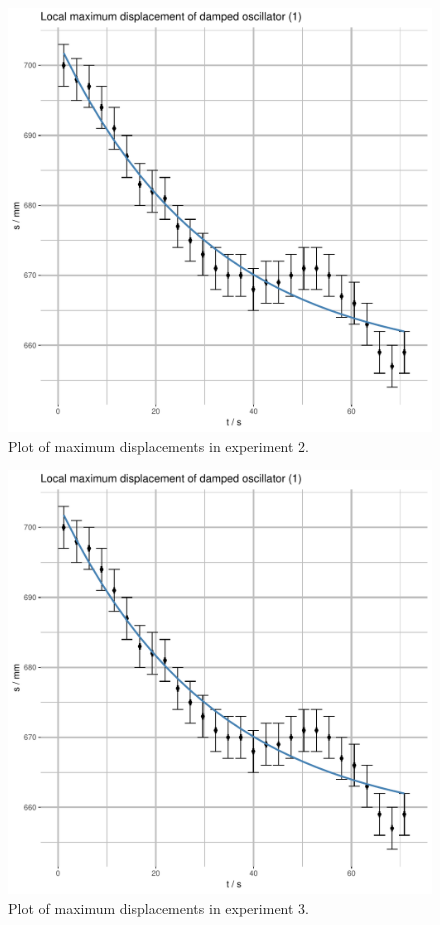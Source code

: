 \documentclass[a4paper,11pt]{article}
\begin{document}
\begin{figure}[H]
\begin{center}
\includegraphics[height=0.45\textheight,page=2]{Rplots.pdf}
\end{center}
\caption{Plot of maximum displacements in experiment 2.}
\label{fig:ex2}
\end{figure}

\begin{figure}[H]
\begin{center}
\includegraphics[height=0.45\textheight,page=3]{Rplots.pdf}
\end{center}
\caption{Plot of maximum displacements in experiment 3.}
\label{fig:ex3}
\end{figure}
\end{document}
